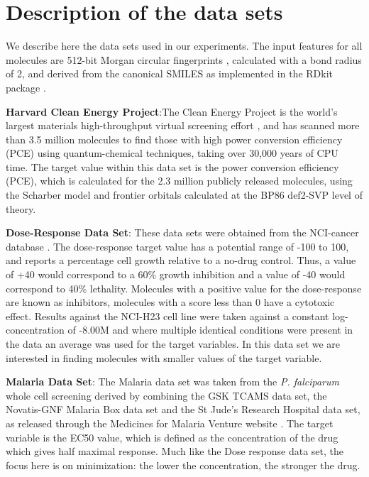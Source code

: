 \section{Description of the data sets}\label{sec:data_sets}

We describe here the data sets used in our experiments. The input features for all molecules are 512-bit Morgan circular fingerprints \cite{Rogers_2010}, calculated with a bond radius of 2, and derived from the canonical SMILES as implemented in the RDkit package \cite{rdkit}.

\textbf{Harvard Clean Energy Project}:The Clean Energy Project is the world's largest materials high-throughput virtual screening effort \cite{Hachmann_2014,Hachmann_2011}, and has scanned more than 3.5 million molecules to find those with high power conversion efficiency (PCE) using quantum-chemical techniques, taking over 30,000 years of CPU time. The target value within this data set is the power conversion efficiency (PCE), which is calculated for the 2.3 million publicly released molecules, using the Scharber model \cite{Dennler_2008} and frontier orbitals calculated at the BP86 \cite{Perdew_1986,Becke_1993} \/ def2-SVP \cite{Weigend_2005} level of theory.

\textbf{Dose-Response Data Set}: These data sets were obtained from the NCI-cancer database \cite{_nci_}.  The dose-response target value has a potential range of -100 to 100, and reports a percentage cell growth relative to a no-drug control.  Thus, a value of +40 would correspond to a 60\% growth inhibition and a value of -40 would correspond to 40\% lethality.  Molecules with a positive value for the dose-response are known as inhibitors, molecules with a score less than 0 have a cytotoxic effect. Results against the NCI-H23 cell line were taken against a constant log-concentration of -8.00M and where multiple identical conditions were present in the data an average was used for the target variables. In this data set we are interested in finding molecules with  smaller values of the target variable.

\textbf{Malaria Data Set}: The Malaria data set was taken from the \textit{P. falciparum} whole cell screening derived by combining the GSK TCAMS data set, the Novatis-GNF Malaria Box data set and the St Jude's Research Hospital data set, as released through the Medicines for Malaria Venture website \cite{Spangenberg_2013}. The target variable is the EC50 value, which is defined as the concentration of the drug which gives half maximal response. Much like the Dose response data set, the focus here is on minimization: the lower the concentration, the stronger the drug.
